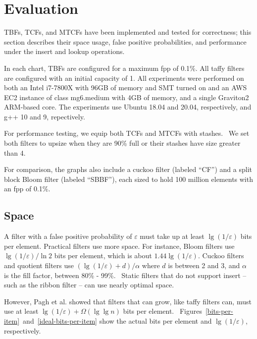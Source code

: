 \documentclass[sigconf, nonacm]{acmart}
\newcommand{\etal}{et al.}
\begin{document}
\section{Evaluation}
\label{eval}


TBFs, TCFs, and MTCFs have been implemented and tested for correctness; this section describes their space usage, false positive probabilities, and performance under the insert and lookup operations.

In each chart, TBFs are configured for a maximum fpp of 0.1\%.
All taffy filters are configured with an initial capacity of 1. %
All experiments were performed on both an Intel i7-7800X with 96GB of memory and SMT turned on and an AWS EC2 instance of class mg6.medium with 4GB of memory, and a single Graviton2 ARM-based core.
The experiments use Ubuntu 18.04 and 20.04, respectively, and g++ 10 and 9, repectively.

For performance testing, we equip both TCFs and MTCFs with stashes.~\cite{stash}
We set both filters to upsize when they are 90\% full or their stashes have size greater than 4.

For comparison, the graphs also include a cuckoo filter (labeled ``CF'') and a split block Bloom filter (labeled ``SBBF''), each sized to hold 100 million elements with an fpp of 0.1\%.

\subsection{Space}

A filter with a false positive probability of $\varepsilon$ must take up at least $\lg (1/\varepsilon)$ bits per element.
Practical filters use more space.
For instance, Bloom filters use $\lg (1/\varepsilon)/\ln 2$ bits per element, which is about $1.44 \lg (1/\varepsilon)$.
Cuckoo filters and quotient filters use $(\lg (1/\varepsilon) + d) / \alpha$ where $d$ is between 2 and 3, and $\alpha$ is the fill factor, between 80\% - 99\%.~\cite{cuckoo,quotient-filter,vector-quotient}
Static filters that do not support insert -- such as the ribbon filter -- can use nearly optimal space.~\cite{ribbon}

However, Pagh \etal{} showed that filters that can grow, like taffy filters can, must use at least $\lg (1/\varepsilon) + \Omega(\lg \lg n)$ bits per element.~\cite{psw}
Figures~\ref{bits-per-item}~and~\ref{ideal-bits-per-item} show the actual bits per element and $\lg (1/\varepsilon)$, respectively.
\end{document}
